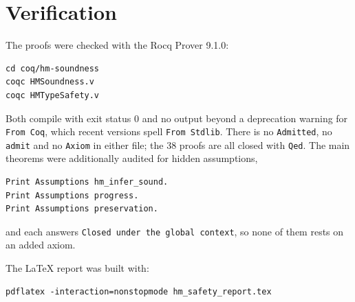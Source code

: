 \documentclass[11pt,a4paper]{article}
\begin{document}
\section{Verification}

The proofs were checked with the Rocq Prover 9.1.0:

\begin{lstlisting}
cd coq/hm-soundness
coqc HMSoundness.v
coqc HMTypeSafety.v
\end{lstlisting}

Both compile with exit status 0 and no output beyond a deprecation warning for
\texttt{From Coq}, which recent versions spell \texttt{From Stdlib}.  There is
no \texttt{Admitted}, no \texttt{admit} and no \texttt{Axiom} in either file;
the 38 proofs are all closed with \texttt{Qed}.  The main theorems were
additionally audited for hidden assumptions,

\begin{lstlisting}
Print Assumptions hm_infer_sound.
Print Assumptions progress.
Print Assumptions preservation.
\end{lstlisting}

and each answers \texttt{Closed under the global context}, so none of them
rests on an added axiom.

The LaTeX report was built with:

\begin{lstlisting}
pdflatex -interaction=nonstopmode hm_safety_report.tex
\end{lstlisting}
\end{document}
